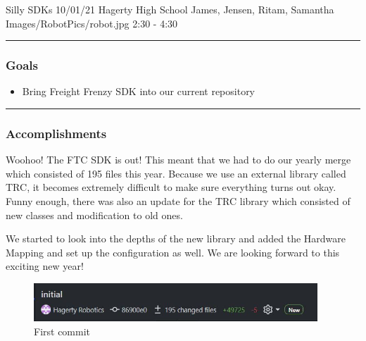\insertmeeting 
	{Silly SDKs} 
	{10/01/21} 
	{Hagerty High School}
	{James, Jensen, Ritam, Samantha}
	{Images/RobotPics/robot.jpg}
	{2:30 - 4:30}
	
\noindent\hfil\rule{\textwidth}{.4pt}\hfil
\subsubsection*{Goals}
\begin{itemize}
    \item Bring Freight Frenzy SDK into our current repository

\end{itemize} 

\noindent\hfil\rule{\textwidth}{.4pt}\hfil

\subsubsection*{Accomplishments}
Woohoo! The FTC SDK is out! This meant that we had to do our yearly merge which consisted of 195 files this year. Because we use an external library called TRC, it becomes extremely difficult to make sure everything turns out okay. Funny enough, there was also an update for the TRC library which consisted of new classes and modification to old ones. 

We started to look into the depths of the new library and added the Hardware Mapping and set up the configuration as well. We are looking forward to this exciting new year!
 


\begin{figure}[htp]
\centering
\includegraphics[width=0.95\textwidth, angle=0]{Meetings/October/10-01-21/10-19-21 - Ritam R.JPG}
\caption{First commit}
\label{fig:100121_1}
\end{figure}




